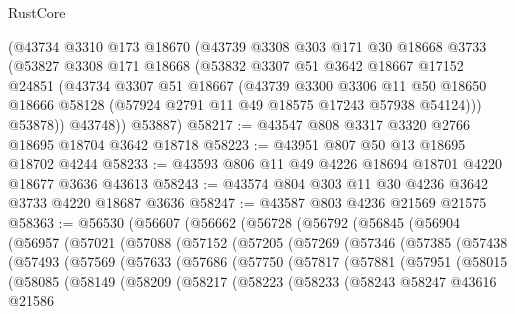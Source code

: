 \begin{lexlean}{RustCore}
\begin{coremodule}
      (@43734
        @3310
        @173
        @18670
        (@43739
          @3308
          @303
          @171
          @30
          @18668
          @3733
          (@53827
            @3308
            @171
            @18668
            (@53832
              @3307
              @51
              @3642
              @18667
              @17152
              @24851
              (@43734
                @3307
                @51
                @18667
                (@43739
                  @3300
                  @3306
                  @11
                  @50
                  @18650
                  @18666
                  @58128
                  (@57924 @2791 @11 @49 @18575 @17243 @57938 @54124)))
              @53878))
          @43748))
      @53887)
@58217 := @43547 @808 @3317 @3320 @2766 @18695 @18704 @3642 @18718
@58223 := @43951 @807 @50 @13 @18695 @18702 @4244
@58233 := @43593 @806 @11 @49 @4226 @18694 @18701 @4220 @18677 @3636 @43613
@58243 := @43574 @804 @303 @11 @30 @4236 @3642 @3733 @4220 @18687 @3636
@58247 := @43587 @803 @4236 @21569 @21575
@58363 := @56530
    (@56607
      (@56662
        (@56728
          (@56792
            (@56845
              (@56904
                (@56957
                  (@57021
                    (@57088
                      (@57152
                        (@57205
                          (@57269
                            (@57346
                              (@57385
                                (@57438
                                  (@57493
                                    (@57569
                                      (@57633
                                        (@57686
                                          (@57750
                                            (@57817
                                              (@57881
                                                (@57951
                                                  (@58015
                                                    (@58085
                                                      (@58149
                                                        (@58209
                                                          (@58217
                                                            (@58223
                                                              (@58233
                                                                (@58243
                                                                  @58247
                                                                  @43616
                                                                  @21586

\end{coremodule}
\end{lexlean}

